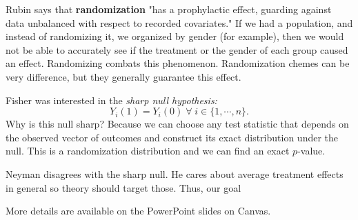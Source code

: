 \documentclass[titlepage, 12pt, leqno]{article}
\begin{document}
Rubin says that \textbf{randomization} "has a prophylactic effect, guarding
against data unbalanced with respect to recorded covariates." If we had a
population, and instead of randomizing it, we organized by gender (for example),
then we would not be able to accurately see if the treatment or the gender of
each group caused an effect. Randomizing combats this phenomenon. Randomization
chemes can be very difference, but they generally guarantee this effect.

Fisher was interested in the \textit{sharp null hypothesis:}
\[
    Y_{i}(1) = Y_{i}(0) \; \forall \; i \in  \{1, \cdots ,n\}.
\]
Why is this null sharp? Because we can choose any test statistic that depends on
the observed vector of outcomes and construct its exact distribution under the
null. This is a randomization distribution and we can find an exact $p$-value.

Neyman disagrees with the sharp null. He cares about average treatment effects
in general so theory should target those. Thus, our goal 

\begin{note}
    More details are available on the PowerPoint slides on Canvas.
\end{note}
\end{document}

